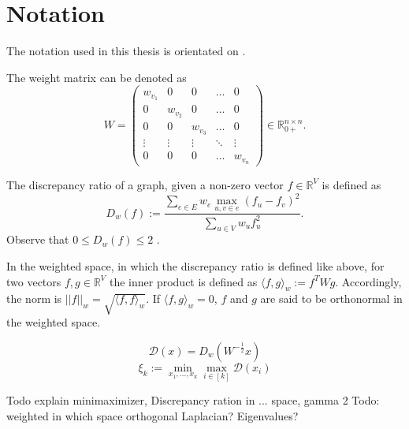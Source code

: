 \chapter{Notation}\label{chapter:notation}

The notation used in this thesis is orientated on \cite{ChanLTZ16}.



The weight matrix can be denoted as \begin{equation}
	W = 
	\begin{pmatrix}
	w_{v_1} & 0 & 0&\dots &0 \\
	0 & w_{v_2} & 0 & \ldots & 0 \\
	0 & 0 & w_{v_3} & \ldots & 0 \\
	\vdots & \vdots & \vdots & \ddots & \vdots \\
	0 &0&0& \ldots  & w_{v_n}
	\end{pmatrix} \in \mathbb{R}_{0+}^{n \times n} .
\end{equation} 

The discrepancy ratio of a graph, given a non-zero vector $f \in \mathbb{R}^V$ is defined as \begin{equation}\label{eq:discrepancy_ratio}
D_w(f) := \frac{\sum_{e\in E} w_e \max_{u,v\in e}(f_u - f_v)^2}{\sum_{u\in V} w_u f_u^2}.
\end{equation} Observe that $0\le D_w(f) \le 2 $ \cite{ChanLTZ16}.

In the weighted space, in which the discrepancy ratio is defined like above, for two vectors $f, g \in \mathbb{R}^V$ the inner product is defined as $ \langle f,g \rangle_w := f^T W g$. Accordingly, the norm is $||f||_w = \sqrt{ \langle f,f \rangle_w}$.
If $ \langle f,g \rangle_w   = 0 $, $f$ and $g$ are said to be orthonormal in the weighted space.


\begin{equation}
\mathcal{D}(x) = D_w(W^{-\frac{1}{2}}x)
\end{equation}
\begin{equation}\label{eq:xi}
	\xi_k := \min_{x_1, \ldots , x_k} \max_{i \in [k]} \mathcal{D}(x_i)
\end{equation}


Todo explain minimaximizer, Discrepancy ration in ... space, gamma 2
Todo: weighted in which space orthogonal
Laplacian? Eigenvalues?


